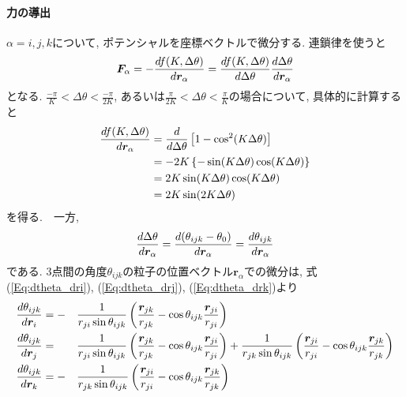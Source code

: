 \paragraph{力の導出}
$\alpha = i, j, k$について, ポテンシャルを座標ベクトルで微分する. 連鎖律を使うと
\begin{align}
   \bm{F}_{\alpha}
   =
   -
   \frac{d f(K, \Delta \theta)}{d \bm{r}_{\alpha}}
   =
   \frac{d f(K, \Delta \theta)}{d \Delta \theta}
   \frac{d \Delta \theta}{d \bm{r}_{\alpha}}
   \notag
\end{align}
となる. $\frac{-\pi}{K} < \Delta \theta < \frac{-\pi}{2K}$, あるいは$\frac{\pi}{2K} < \Delta \theta < \frac{\pi}{K}$の場合について, 具体的に計算すると
\begin{align}
   \frac{d f(K, \Delta \theta)}{d \bm{r}_{\alpha}}
   &=
   \frac{d}{d \Delta \theta}
   \left[
      1 - \cos^{2} (K \Delta \theta)
   \right]
   \notag \\
   &=
   - 2K \left\{-\sin(K \Delta \theta) \cos(K \Delta \theta)\right\}
   \notag \\
   &=
   2K \sin(K \Delta \theta) \cos(K \Delta \theta)
   \notag \\
   &=
   2K \sin (2K \Delta \theta)
   \notag
\end{align}
を得る.　一方,
\begin{align}
   \frac{d \Delta \theta}{d \bm{r}_{\alpha}}
   =
   \frac{d (\theta_{ijk} - \theta_{0})}{d \bm{r}_{\alpha}}
   =
   \frac{d \theta_{ijk}}{d \bm{r}_{\alpha}}
   \notag
\end{align}
である. 3点間の角度$\theta_{ijk}$の粒子の位置ベクトル$\bm{r}_{\alpha}$での微分は, 式(\ref{Eq:dtheta_dri}), (\ref{Eq:dtheta_drj}), (\ref{Eq:dtheta_drk})より
\begin{alignat}{3}
   \frac{d \theta_{ijk}}{d \bm{r}_{i}}
   &=
   -&&
   \frac{1}{r_{ji} \sin\theta_{ijk}}
   \left(
            \frac{\bm{r}_{jk}}{r_{jk}}
          - \cos\theta_{ijk} \frac{\bm{r}_{ji}}{r_{ji}}
   \right)
   \notag
   \\
   \frac{d \theta_{ijk}}{d \bm{r}_{j}}
   &=&&
   \frac{1}{r_{ji} \sin\theta_{ijk}}
   \left(
            \frac{\bm{r}_{jk}}{r_{jk}}
          - \cos\theta_{ijk} \frac{\bm{r}_{ji}}{r_{ji}}
   \right)
   +
   \frac{1}{r_{jk} \sin\theta_{ijk}}
   \left(
            \frac{\bm{r}_{ji}}{r_{ji}}
          - \cos\theta_{ijk} \frac{\bm{r}_{jk}}{r_{jk}}
   \right)
   \notag
   \\
   \frac{d \theta_{ijk}}{d \bm{r}_{k}}
   &=
   -&&
   \frac{1}{r_{jk} \sin\theta_{ijk}}
   \left(
           \frac{\bm{r}_{ji}}{r_{ji}}
         - \cos\theta_{ijk} \frac{\bm{r}_{jk}}{r_{jk}}
   \right)
   \notag
\end{alignat}
